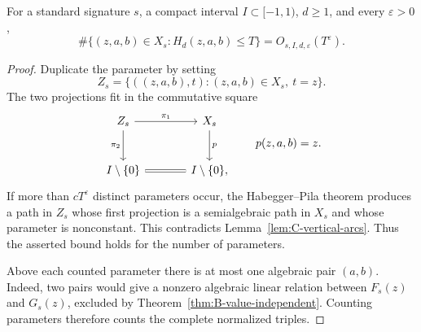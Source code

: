 \begin{theorem}
\label{thm:C-normalized-counting}
For a standard signature $s$, a compact interval $I\subset[-1,1)$,
$d\geq1$, and every $\varepsilon>0$,
\[
 \#\{(z,a,b)\in X_s:H_d(z,a,b)\leq T\}
                    =O_{s,I,d,\varepsilon}(T^\varepsilon).
\]
\end{theorem}
\begin{proof}
Duplicate the parameter by setting
\[
 Z_s=\{((z,a,b),t):(z,a,b)\in X_s,\ t=z\}.
\]
The two projections fit in the commutative square
\[
 \begin{tikzcd}[column sep=large,row sep=large]
 Z_s \arrow[r,"\pi_1"] \arrow[d,"\pi_2"'] &
 X_s \arrow[d,"p"] \\
 I\setminus\{0\} \arrow[r,equal] & I\setminus\{0\},
 \end{tikzcd}
 \qquad p(z,a,b)=z.
\]
If more than $cT^\varepsilon$ distinct parameters occur, the
Habegger--Pila theorem produces a path in $Z_s$ whose first projection
is a semialgebraic path in $X_s$ and whose parameter is nonconstant.
This contradicts Lemma~\ref{lem:C-vertical-arcs}.  Thus the asserted
bound holds for the number of parameters.

Above each counted parameter there is at most one algebraic pair
$(a,b)$.  Indeed, two pairs would give a nonzero algebraic linear
relation between $F_s(z)$ and $G_s(z)$, excluded by
Theorem~\ref{thm:B-value-independent}.  Counting parameters therefore
counts the complete normalized triples.
\end{proof}

